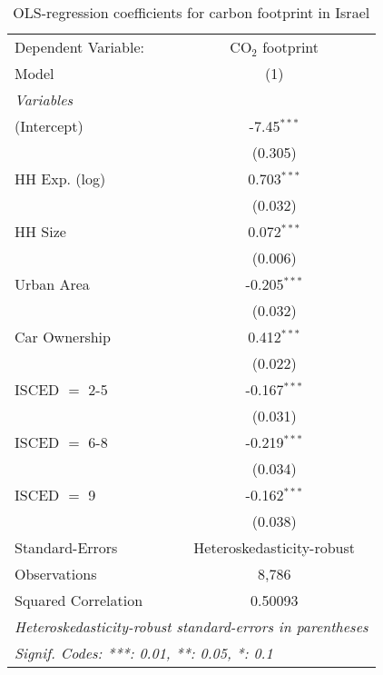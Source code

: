 
\begin{table}[htbp!]
   \centering
   \small
   \begin{adjustbox}{width = 1\textwidth, max height = 0.95\textheight, center}
      \begin{threeparttable}[b]
         \caption{\label{tab:OLS_2_ISR} OLS-regression coefficients for carbon footprint in Israel}
         \begin{tabular}{lc}
            \tabularnewline \midrule \midrule
            Dependent Variable: & CO$_{2}$ footprint\\  
            Model               & (1)\\  
            \midrule
            \emph{Variables}\\
            (Intercept)         & -7.45$^{***}$\\   
                                & (0.305)\\   
            HH Exp. (log)       & 0.703$^{***}$\\   
                                & (0.032)\\   
            HH Size             & 0.072$^{***}$\\   
                                & (0.006)\\   
            Urban Area          & -0.205$^{***}$\\   
                                & (0.032)\\   
            Car Ownership       & 0.412$^{***}$\\   
                                & (0.022)\\   
            ISCED $=$ 2-5       & -0.167$^{***}$\\   
                                & (0.031)\\   
            ISCED $=$ 6-8       & -0.219$^{***}$\\   
                                & (0.034)\\   
            ISCED $=$ 9         & -0.162$^{***}$\\   
                                & (0.038)\\   
            \midrule 
            Standard-Errors     & Heteroskedasticity-robust \\   
            Observations        & 8,786\\  
            Squared Correlation & 0.50093\\  
            \midrule \midrule
            \multicolumn{2}{l}{\emph{Heteroskedasticity-robust standard-errors in parentheses}}\\
            \multicolumn{2}{l}{\emph{Signif. Codes: ***: 0.01, **: 0.05, *: 0.1}}\\
         \end{tabular}
         

\end{threeparttable}
\end{adjustbox}
\end{table}
